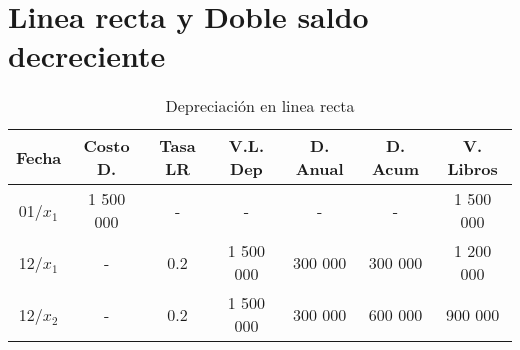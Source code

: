 \documentclass[10pt,a4paper]{report}
\begin{document}
\section{Linea recta y Doble saldo decreciente}
	\begin{table}[h]
	\centering
	\caption{Depreciación en linea recta}	
	
	\begin{tabular}{|c|c|c|c|c|c|c|} \hline
	
	Fecha    & Costo D.  & Tasa LR & V.L. Dep  & D. Anual & D. Acum & V. Libros \\ \hline

	01/$x_1$ & 1 500 000 & -       & -         & -        & -       & 1 500 000 \\ \hline

	12/$x_1$ & -         & 0.2     & 1 500 000 & 300 000  & 300 000 & 1 200 000 \\ \hline

	12/$x_2$ & -         & 0.2     & 1 500 000 & 300 000  & 600 000 & 900 000   \\ \hline
	

	\end{tabular}
	\end{table}
	
\end{document}
